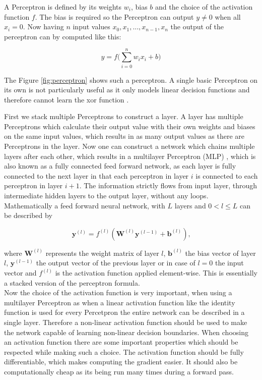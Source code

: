 \documentclass[twoside,a4paper,10pt,DIV=12,BCOR=12mm]{scrartcl}
\begin{document}
A Perceptron is defined by its weights $w_i$, bias $b$ and the choice of the activation function $f$.
The bias is required so the Perceptron can output $y \neq 0$ when all $x_i = 0$.
Now having $n$ input values $x_0, x_1, ..., x_{n-1}, x_n$ the output of the perceptron can by computed like this:

$$
y=f\bigl(\sum_{i=0}^{n}w_i x_i + b\bigr)
$$


The Figure \ref{fig:perceptron} shows such a perceptron.
A single basic Perceptron on its own is not particularly useful as
it only models linear decision functions and therefore cannot learn the xor function \cite{MinskyPapert69}.

First we stack multiple Perceptrons to construct a layer. A layer has multiple
Perceptrons which calculate their output value with their own weights and biases on the same input values, which results
in as many output values as there are Perceptrons in the layer. Now one can construct a network which chains
multiple layers after each other, which results in a multilayer Perceptron (MLP) \cite{Rumelhart86}, which is also known as a fully connected
feed forward network, as each layer is fully connected to the next layer in that each perceptron in layer $i$ 
is connected to each perceptron in layer $i+1$. The information strictly flows from input layer, through
intermediate hidden layers to the output layer, without any loops.
Mathematically a feed forward neural network, with $L$ layers and $0 < l \leq L$ can be described by

$$\mathbf{y}^{(l)} = f^{(l)}(\mathbf{W}^{(l)}\mathbf{y}^{(l-1)}+\mathbf{b}^{(l)})\text{,}$$

where $\mathbf{W}^{(l)}$ represents the weight matrix of layer $l$, $\mathbf{b}^{(l)}$ the bias vector of layer $l$,
$\mathbf{y}^{(l-1)}$ the output vector of the previous layer or in case of $l=0$ the input vector
and $f^{(l)}$ is the activation function applied element-wise. 
This is essentially a stacked version of the perceptron formula.\\


Now the choice of the activation function is very important, when using a multilayer Perceptron as when a linear activation function like the 
identity function is used for every Percetpron the entire network can be described in a single layer. Therefore
a non-linear activation function should be used to make the network capable of learning non-linear
decision boundaries. When choosing an activation function there are some important
properties which should be respected while making such a choice. The activation function should be fully differentiable, which makes
computing the gradient easier. It should also be computationally
cheap as its being run many times during a forward pass. \\
\end{document}
